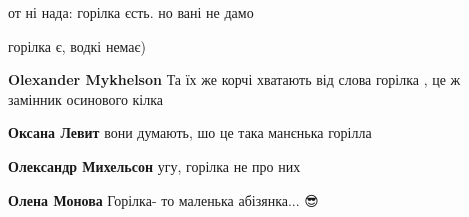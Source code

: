 \begin{itemize}
 

от ні нада: горілка єсть. но вані не дамо \Smiley[1.0][yellow]

\begin{itemize}
 
горілка є, водкі немає)

 
\textbf{Olexander Mykhelson} Та їх же корчі хватають від слова горілка , це ж замінник осинового кілка

 

\textbf{Оксана Левит} вони думають, шо це така манєнька горілла \Smiley[1.0][yellow]

 
\textbf{Олександр Михельсон} угу, горілка не про них

 
\textbf{Олена Монова}
Горілка- то маленька абізянка... 😎

 

\end{itemize}
\end{itemize}
